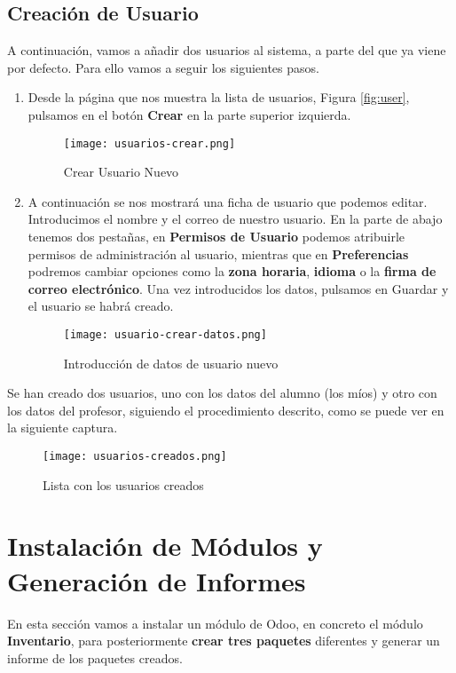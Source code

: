 \subsection{Creación de Usuario}
A continuación, vamos a añadir dos usuarios al sistema, a parte del que ya viene por defecto. Para ello vamos a seguir los siguientes pasos.

\begin{enumerate}
    \item Desde la página que nos muestra la lista de usuarios, Figura \ref{fig:user}, pulsamos en el botón \textbf{Crear} en la parte superior izquierda.

     \begin{figure}[ht]
        \centering
        \texttt{[image: usuarios-crear.png]}
        \caption{Crear Usuario Nuevo}
    \end{figure}

    \item A continuación se nos mostrará una ficha de usuario que podemos editar. Introducimos el nombre y el correo de nuestro usuario. En la parte de abajo tenemos dos pestañas, en \textbf{Permisos de Usuario} podemos atribuirle permisos de administración al usuario, mientras que en \textbf{Preferencias} podremos cambiar opciones como la \textbf{zona horaria}, \textbf{idioma} o la \textbf{firma de correo electrónico}. Una vez introducidos los datos, pulsamos en Guardar y el usuario se habrá creado.

    \begin{figure}[ht]
        \centering
        \texttt{[image: usuario-crear-datos.png]}
        \caption{Introducción de datos de usuario nuevo}
    \end{figure}
\end{enumerate}

Se han creado dos usuarios, uno con los datos del alumno (los míos) y otro con los datos del profesor, siguiendo el procedimiento descrito, como se puede ver en la siguiente captura.

\begin{figure}[ht]
    \centering
    \texttt{[image: usuarios-creados.png]}
    \caption{Lista con los usuarios creados}
\end{figure}

\section{Instalación de Módulos y Generación de Informes}
En esta sección vamos a instalar un módulo de Odoo, en concreto el módulo \textbf{Inventario}, para posteriormente \textbf{crear tres paquetes} diferentes y generar un informe de los paquetes creados.

